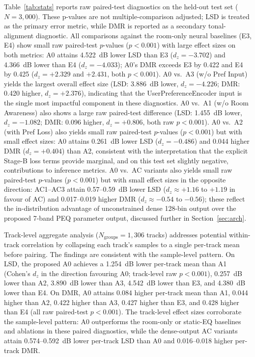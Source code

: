 \documentclass{aes2e}
\begin{document}
Table~\ref{tab:stats} reports raw paired-test diagnostics on the
held-out test set ($N=3{,}000$).
These p-values are not multiple-comparison adjusted; LSD is treated as the
primary error metric, while DMR is reported as a secondary tonal-alignment
diagnostic.
All comparisons against the room-only neural baselines (E3, E4) show
small raw paired-test $p$-values ($p < 0.001$) with large effect sizes on both metrics:
A0 attains 4.522~dB lower LSD than E3 ($d_z = -3.702$) and 4.366~dB
lower than E4 ($d_z = -4.033$); A0's DMR exceeds E3 by 0.422 and E4 by
0.425 ($d_z = +2.329$ and $+2.431$, both $p < 0.001$).
A0 vs.\ A3 (w/o Pref Input) yields the largest overall effect size
(LSD: 3.886~dB lower, $d_z = -4.226$; DMR: 0.420 higher,
$d_z = +2.376$), indicating that the UserPreferenceEncoder input is the
single most impactful component in these diagnostics.
A0 vs.\ A1 (w/o Room Awareness) also shows a large raw paired-test difference
(LSD: 1.455~dB lower, $d_z = -1.082$; DMR: 0.096 higher,
$d_z = +0.806$, both raw $p < 0.001$).
A0 vs.\ A2 (with Pref Loss) also yields small raw paired-test $p$-values
($p < 0.001$) but with small effect sizes: A0 attains 0.261~dB lower LSD
($d_z = -0.486$) and 0.044 higher DMR ($d_z = +0.404$) than A2,
consistent with the interpretation that the explicit Stage-B loss
terms provide marginal, and on this test set slightly negative,
contributions to inference metrics.
A0 vs.\ AC variants also yields small raw paired-test $p$-values
($p < 0.001$) but with small effect sizes in the opposite direction: AC1--AC3 attain 0.57--0.59~dB
lower LSD ($d_z \approx +1.16$ to $+1.19$ in favour of AC) and 0.017--0.019
higher DMR ($d_z \approx -0.54$ to $-0.56$); these reflect the
in-distribution advantage of unconstrained dense 128-bin output over
the proposed 7-band PEQ parameter output, discussed further in
Section~\ref{sec:arch}.

Track-level aggregate analysis ($N_\text{groups} = 1{,}306$ tracks)
addresses potential within-track correlation by collapsing each
track's samples to a single per-track mean before pairing.
The findings are consistent with the sample-level pattern.
On LSD, the proposed A0 achieves a 1.254~dB lower per-track mean than
A1 (Cohen's $d_z$ in the direction favouring A0; track-level
raw $p < 0.001$), 0.257~dB lower than A2,
3.890~dB lower than A3, 4.542~dB lower than E3, and 4.380~dB lower
than E4.
On DMR, A0 attains 0.084 higher per-track mean than A1, 0.044 higher
than A2, 0.422 higher than A3, 0.427 higher than E3, and 0.428 higher
than E4 (all raw paired-test $p < 0.001$).
The track-level effect sizes corroborate the sample-level pattern:
A0 outperforms the room-only or static-EQ baselines and ablations in these
paired diagnostics, while the dense-output AC variants attain 0.574--0.592~dB
lower per-track LSD than A0 and 0.016--0.018 higher per-track DMR.
\end{document}
